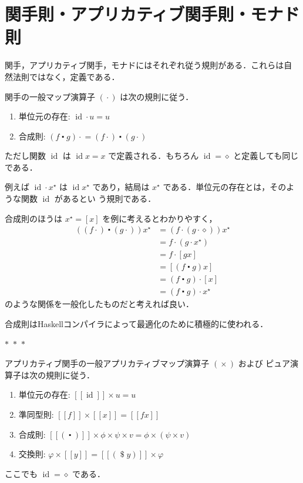 \documentclass[a5paper,twoside,fleqn,draft]{jsbook}
\def\[{[\![}
\def\]{]\!]}
\newcommand{\separator}{\begin{center}$*$~$*$~$*$\end{center}}
\newcommand{\programminglanguage}[1]{\textsf{#1}}
\newcommand{\haskell}{\programminglanguage{Haskell}}
\newcommand{\mAnonParam}{\diamond}
\newcommand{\mSpecialFunc}[1]{#1}
\DeclareMathOperator{\mId}{\mSpecialFunc{id}}
\DeclareMathOperator{\mApply}{\$}
\DeclareMathOperator{\mAppMap}{\times}
\DeclareMathOperator{\mComp}{\centerdot}
\DeclareMathOperator{\mMap}{\cdot}
\newcommand{\mPureWith}[1]{\[#1\]}
\newcommand{\mList}[1]{{#1}^\mathrm{\star}}
\begin{document}
\section{関手則・アプリカティブ関手則・モナド則}

関手，アプリカティブ関手，モナドにはそれぞれ従う規則がある．これらは自
然法則ではなく，定義である．

関手の一般マップ演算子 $(\mMap)$ は次の規則に従う．
\begin{enumerate}
\item 単位元の存在: $\mId\mMap u=u$
\item 合成則: $(f\mComp g)\mMap=(f\mMap)\mComp{}(g\mMap)$%
\end{enumerate}
ただし関数 $\mId$ は $\mId x=x$ で定義される．もちろん
$\mId=\mAnonParam$ と定義しても同じである．


例えば $\mId\mMap\mList{x}$ は $\mId\mList{x}$ であり，結局は
$\mList{x}$ である．単位元の存在とは，そのような関数 $\mId$ があるとい
う規則である．

合成則のほうは $\mList{x}=[x]$ を例に考えるとわかりやすく，
\begin{align}
  ((f\mMap)\mComp(g\mMap))\mList{x}
  &=(f\mMap{}(g\mMap\mAnonParam))\mList{x}\\
  &=f\mMap{}(g\mMap\mList{x})\\
  &=f\mMap{}[gx]\\
  &=[(f\mComp g)x]\\
  &=(f\mComp g)\mMap{}[x]\\
  &=(f\mComp g)\mMap\mList{x}
\end{align}
のような関係を一般化したものだと考えれば良い．

合成則は\haskell コンパイラによって最適化のために積極的に使われる．

\separator

アプリカティブ関手の一般アプリカティブマップ演算子 $(\mAppMap)$ および
ピュア演算子は次の規則に従う．
\begin{enumerate}
\item 単位元の存在: $\mPureWith{\mId}\mAppMap u=u$
\item 準同型則: $\mPureWith{f}\mAppMap\mPureWith{x}=\mPureWith{fx}$
\item 合成則: $\mPureWith{(\mComp)}\mAppMap\phi\mAppMap\psi\mAppMap v=\phi\mAppMap{}(\psi\mAppMap v)$
\item 交換則: $\varphi\mAppMap\mPureWith{y}=\mPureWith{(\mApply y)}\mAppMap\varphi$
\end{enumerate}
ここでも $\mId=\mAnonParam$ である．
\end{document}
